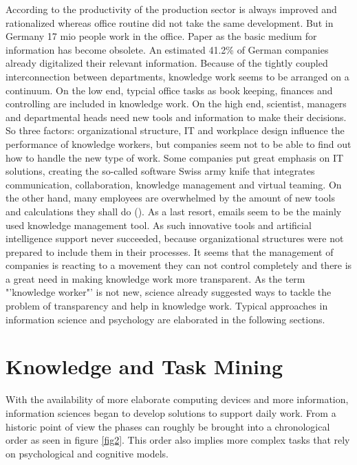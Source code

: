 According to \cite{spaeth2009info} the productivity of the production sector is always improved and rationalized whereas office routine did not take the same development. But in Germany 17 mio people work in the office. Paper as the basic medium for information has become obsolete. An estimated 41.2\% of German companies already digitalized their relevant information. Because of the tightly coupled interconnection between departments, knowledge work seems to be arranged on a continuum. On the low end, typcial office tasks as book keeping, finances and controlling are included in knowledge work. On the high end, scientist, managers and departmental heads need new tools and information to make their decisions. So three factors: organizational structure, IT and workplace design influence the performance of knowledge workers, but companies seem not to be able to find out how to handle the new type of work. Some companies put great emphasis on IT solutions, creating the so-called software Swiss army knife that integrates communication, collaboration, knowledge management and virtual teaming. On the other hand, many employees are overwhelmed by the amount of new tools and calculations they shall do (\cite{davenport2012mysterious}). As a last resort, emails seem to be the mainly used knowledge management tool. As such innovative tools and artificial intelligence support never succeeded, because organizational structures were not prepared to include them in their processes. It seems that the management of companies is reacting to a movement they can not control completely and there is a great need in making knowledge work more transparent. As the term "'knowledge worker"' is not new, science already suggested ways to tackle the problem of transparency and help in knowledge work. Typical approaches in information science and psychology are elaborated in the following sections.


\section{Knowledge and Task Mining}
\label{knowledgeandtask}

With the availability of more elaborate computing devices and more information, information sciences began to develop solutions to support daily work. From a historic point of view the phases can roughly be brought into a chronological order as seen in figure \ref{fig2}. This order also implies more complex tasks that rely on psychological and cognitive models. 

